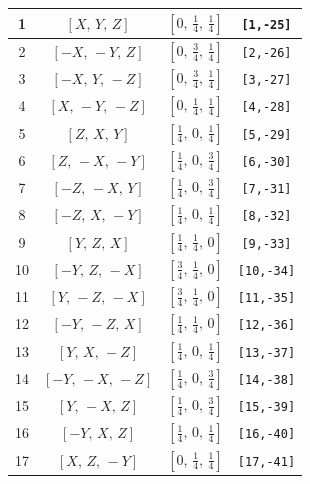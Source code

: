 \documentclass[fleqn,8pt]{jsarticle}
\begin{document}
\begin{longtable}{cccc}
1 & $\left[ X,\, Y,\, Z \right]$ & $\left[ 0,\, \frac{1}{4},\, \frac{1}{4} \right]$ & {\tt [1,-25]} \\ \hline
2 & $\left[ - X,\, - Y,\, Z \right]$ & $\left[ 0,\, \frac{3}{4},\, \frac{1}{4} \right]$ & {\tt [2,-26]} \\ \hline
3 & $\left[ - X,\, Y,\, - Z \right]$ & $\left[ 0,\, \frac{3}{4},\, \frac{1}{4} \right]$ & {\tt [3,-27]} \\ \hline
4 & $\left[ X,\, - Y,\, - Z \right]$ & $\left[ 0,\, \frac{1}{4},\, \frac{1}{4} \right]$ & {\tt [4,-28]} \\ \hline
5 & $\left[ Z,\, X,\, Y \right]$ & $\left[ \frac{1}{4},\, 0,\, \frac{1}{4} \right]$ & {\tt [5,-29]} \\ \hline
6 & $\left[ Z,\, - X,\, - Y \right]$ & $\left[ \frac{1}{4},\, 0,\, \frac{3}{4} \right]$ & {\tt [6,-30]} \\ \hline
7 & $\left[ - Z,\, - X,\, Y \right]$ & $\left[ \frac{1}{4},\, 0,\, \frac{3}{4} \right]$ & {\tt [7,-31]} \\ \hline
8 & $\left[ - Z,\, X,\, - Y \right]$ & $\left[ \frac{1}{4},\, 0,\, \frac{1}{4} \right]$ & {\tt [8,-32]} \\ \hline
9 & $\left[ Y,\, Z,\, X \right]$ & $\left[ \frac{1}{4},\, \frac{1}{4},\, 0 \right]$ & {\tt [9,-33]} \\ \hline
10 & $\left[ - Y,\, Z,\, - X \right]$ & $\left[ \frac{3}{4},\, \frac{1}{4},\, 0 \right]$ & {\tt [10,-34]} \\ \hline
11 & $\left[ Y,\, - Z,\, - X \right]$ & $\left[ \frac{3}{4},\, \frac{1}{4},\, 0 \right]$ & {\tt [11,-35]} \\ \hline
12 & $\left[ - Y,\, - Z,\, X \right]$ & $\left[ \frac{1}{4},\, \frac{1}{4},\, 0 \right]$ & {\tt [12,-36]} \\ \hline
13 & $\left[ Y,\, X,\, - Z \right]$ & $\left[ \frac{1}{4},\, 0,\, \frac{1}{4} \right]$ & {\tt [13,-37]} \\ \hline
14 & $\left[ - Y,\, - X,\, - Z \right]$ & $\left[ \frac{1}{4},\, 0,\, \frac{3}{4} \right]$ & {\tt [14,-38]} \\ \hline
15 & $\left[ Y,\, - X,\, Z \right]$ & $\left[ \frac{1}{4},\, 0,\, \frac{3}{4} \right]$ & {\tt [15,-39]} \\ \hline
16 & $\left[ - Y,\, X,\, Z \right]$ & $\left[ \frac{1}{4},\, 0,\, \frac{1}{4} \right]$ & {\tt [16,-40]} \\ \hline
17 & $\left[ X,\, Z,\, - Y \right]$ & $\left[ 0,\, \frac{1}{4},\, \frac{1}{4} \right]$ & {\tt [17,-41]} \\ \hline

\end{longtable}
\end{document}
